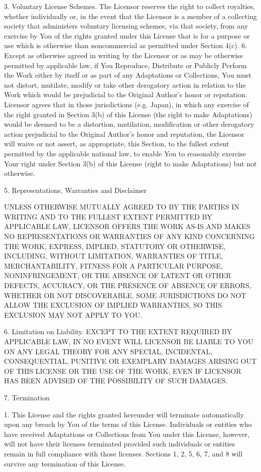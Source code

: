 3. Voluntary License Schemes. The Licensor reserves the right to
collect royalties, whether individually or, in the event that the
Licensor is a member of a collecting society that administers
voluntary licensing schemes, via that society, from any exercise by
You of the rights granted under this License that is for a purpose
or use which is otherwise than noncommercial as permitted under
Section 4(c). 6. Except as otherwise agreed in writing by the
Licensor or as may be otherwise permitted by applicable law, if You
Reproduce, Distribute or Publicly Perform the Work either by itself
or as part of any Adaptations or Collections, You must not distort,
mutilate, modify or take other derogatory action in relation to the
Work which would be prejudicial to the Original Author's honor or
reputation. Licensor agrees that in those jurisdictions (e.g.
Japan), in which any exercise of the right granted in Section 3(b)
of this License (the right to make Adaptations) would be deemed to
be a distortion, mutilation, modification or other derogatory
action prejudicial to the Original Author's honor and reputation,
the Licensor will waive or not assert, as appropriate, this
Section, to the fullest extent permitted by the applicable national
law, to enable You to reasonably exercise Your right under Section
3(b) of this License (right to make Adaptations) but not
otherwise.

5. Representations, Warranties and Disclaimer

UNLESS OTHERWISE MUTUALLY AGREED TO BY THE PARTIES IN WRITING AND
TO THE FULLEST EXTENT PERMITTED BY APPLICABLE LAW, LICENSOR OFFERS
THE WORK AS-IS AND MAKES NO REPRESENTATIONS OR WARRANTIES OF ANY
KIND CONCERNING THE WORK, EXPRESS, IMPLIED, STATUTORY OR OTHERWISE,
INCLUDING, WITHOUT LIMITATION, WARRANTIES OF TITLE,
MERCHANTABILITY, FITNESS FOR A PARTICULAR PURPOSE, NONINFRINGEMENT,
OR THE ABSENCE OF LATENT OR OTHER DEFECTS, ACCURACY, OR THE
PRESENCE OF ABSENCE OF ERRORS, WHETHER OR NOT DISCOVERABLE. SOME
JURISDICTIONS DO NOT ALLOW THE EXCLUSION OF IMPLIED WARRANTIES, SO
THIS EXCLUSION MAY NOT APPLY TO YOU.

6. Limitation on Liability. EXCEPT TO THE EXTENT REQUIRED BY
APPLICABLE LAW, IN NO EVENT WILL LICENSOR BE LIABLE TO YOU ON ANY
LEGAL THEORY FOR ANY SPECIAL, INCIDENTAL, CONSEQUENTIAL, PUNITIVE
OR EXEMPLARY DAMAGES ARISING OUT OF THIS LICENSE OR THE USE OF THE
WORK, EVEN IF LICENSOR HAS BEEN ADVISED OF THE POSSIBILITY OF SUCH
DAMAGES.

7. Termination

1. This License and the rights granted hereunder will terminate
automatically upon any breach by You of the terms of this License.
Individuals or entities who have received Adaptations or
Collections from You under this License, however, will not have
their licenses terminated provided such individuals or entities
remain in full compliance with those licenses. Sections 1, 2, 5, 6,
7, and 8 will survive any termination of this License.

